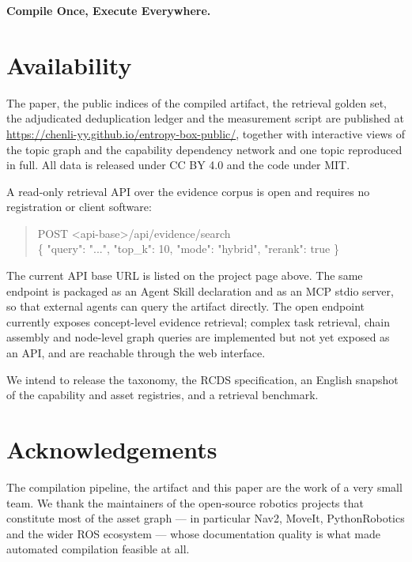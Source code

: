 \documentclass[10pt,a4paper]{article}
\begin{document}
\textbf{Compile Once, Execute Everywhere.}

\section*{Availability}

The paper, the public indices of the compiled artifact, the retrieval golden set,
the adjudicated deduplication ledger and the measurement script are published at
\url{https://chenli-yy.github.io/entropy-box-public/}, together with interactive views of
the topic graph and the capability dependency network and one topic reproduced in
full. All data is released under CC BY 4.0 and the code under MIT.

A read-only retrieval API over the evidence corpus is open and requires no
registration or client software:

\begin{quote}\ttfamily\small
POST <api-base>/api/evidence/search\\
\{ "query": "...", "top\_k": 10, "mode": "hybrid", "rerank": true \}
\end{quote}

\noindent The current API base URL is listed on the project page above. The same
endpoint is packaged as an Agent Skill declaration and as an MCP stdio server, so
that external agents can query the artifact directly. The
open endpoint currently exposes concept-level evidence retrieval; complex
task retrieval, chain assembly and node-level graph queries are implemented but
not yet exposed as an API, and are reachable through the web interface.

We intend to release the taxonomy, the RCDS specification, an English snapshot of
the capability and asset registries, and a retrieval benchmark.

\section*{Acknowledgements}

The compilation pipeline, the artifact and this paper are the work of a very
small team. We thank the maintainers of the open-source robotics projects that
constitute most of the asset graph --- in particular Nav2, MoveIt, PythonRobotics
and the wider ROS ecosystem --- whose documentation quality is what made
automated compilation feasible at all.
\end{document}
